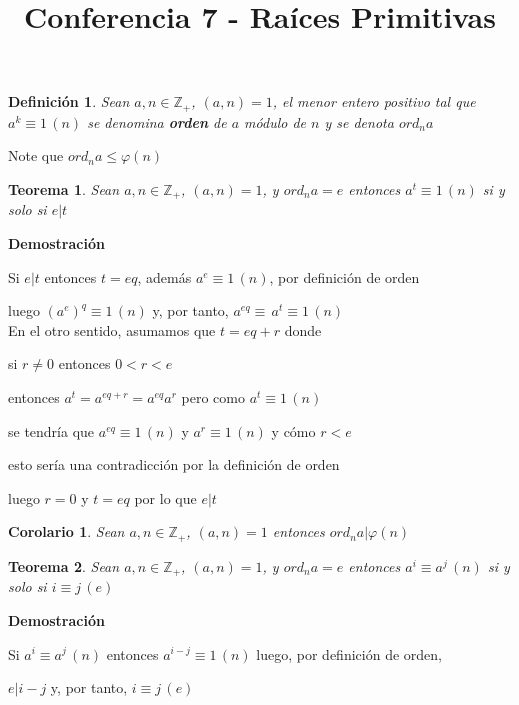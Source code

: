 \documentclass[a4paper,12pt]{report}
\title{Conferencia 7 - Raíces Primitivas}
\author{}
\newtheorem*{teo}{Teorema}
\newtheorem*{cor}{Corolario}
\newtheorem*{dfn}{Definición}
\begin{document}
\maketitle



\begin{dfn}
Sean $a,n\in\mathbb{Z}_+$, $(a,n)=1$, el menor entero positivo tal que $a^k \equiv 1 \, (n)$ se denomina
\textbf{orden} de $a$ módulo de $n$ y se denota $ord_na$
\end{dfn}

Note que $ord_na\leq\varphi(n)$

\begin{teo}
 Sean $a,n\in\mathbb{Z}_+$, $(a,n)=1$, y $ord_na=e$ entonces $a^t \equiv 1 \, (n)$ si y solo si $e|t$
\end{teo}

\textbf{Demostración}

Si $e|t$ entonces $t=eq$, además $a^e \equiv 1 \, (n)$, por definición de orden

luego $(a^e)^q \equiv 1 \, (n)$ y, por tanto, $a^{eq}\equiv\, a^t  \equiv 1 \, (n)$ 
\\

En el otro sentido, asumamos que $t=eq+r$ donde 

si $r\neq 0$ entonces $0<r<e$

entonces $a^t=a^{eq+r}=a^{eq}a^r$ pero como  $a^t \equiv 1 \, (n)$ 

se tendría que $a^{eq} \equiv 1 \, (n)$ y $a^r \equiv 1 \, (n)$   y cómo $r<e$ 

esto sería una contradicción por la definición de orden

luego $r=0$ y $t=eq$ por lo que $e|t$

\begin{cor}
 Sean $a,n\in\mathbb{Z}_+$, $(a,n)=1$ entonces $ord_na|\varphi(n)$
\end{cor}


\begin{teo}
 Sean $a,n\in\mathbb{Z}_+$, $(a,n)=1$, y $ord_na=e$ entonces $a^i \equiv a^j \, (n)$ si y solo si
 $i \equiv j \, (e)$
\end{teo}

\textbf{Demostración}

Si $a^i \equiv a^j \, (n)$ entonces $a^{i-j} \equiv 1 \, (n)$ luego, por definición de orden,

$e|i-j$ y, por tanto,  $i \equiv j \, (e)$
\\
\end{document}
